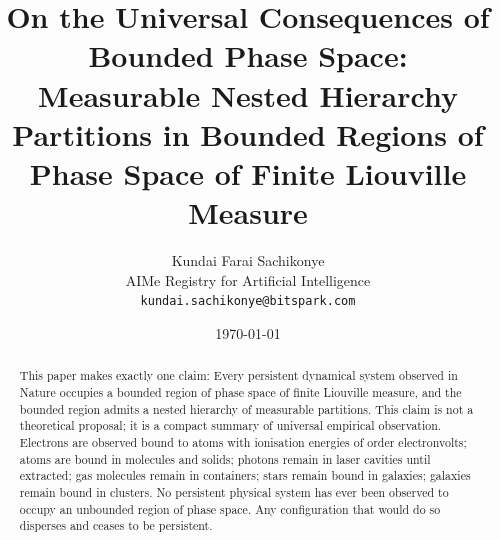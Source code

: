 \documentclass[11pt,twocolumn,a4paper]{article}
\title{\Large \textbf{On the Universal Consequences of Bounded Phase Space:\\ Measurable Nested Hierarchy Partitions in Bounded Regions of Phase Space of Finite Liouville Measure}}
\author{Kundai Farai Sachikonye\\[2pt]
\small AIMe Registry for Artificial Intelligence\\
\small \texttt{kundai.sachikonye@bitspark.com}}
\date{\today}
\theoremstyle{axiomstyle}
\theoremstyle{conseqstyle}
\theoremstyle{definition}
\theoremstyle{remark}
\begin{document}
\maketitle

\begin{abstract}
\noindent
This paper makes exactly one claim: Every persistent dynamical system observed in Nature occupies a bounded region of phase space of finite Liouville measure, and the bounded region admits a nested hierarchy of measurable partitions. This claim is not a theoretical proposal; it is a compact summary of universal empirical observation. Electrons are observed bound to atoms with ionisation energies of order electronvolts; atoms are bound in molecules and solids; photons remain in laser cavities until extracted; gas molecules remain in containers; stars remain bound in galaxies; galaxies remain bound in clusters. No persistent physical system has ever been observed to occupy an unbounded region of phase space. Any configuration that would do so disperses and ceases to be persistent.


\end{abstract}
\end{document}
